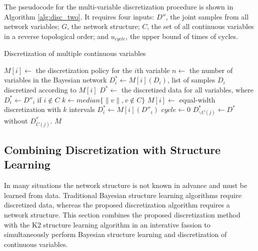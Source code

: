 The pseudocode for the multi-variable discretization procedure is shown in Algorithm \ref{alg:disc_two}.
It requires four inputs: $D''$, the joint samples from all network variables; $G$, the network structure; $C$, the set of all continuous variables in a reverse topological order; and $u_{cycle}$, the upper bound of times of cycles.

\begin{algorithm}
\label{alg:disc_two}
\caption{Discretization of multiple continuous variables }
\begin{algorithmic}[5]
\State
\State $M[i] \leftarrow$ the discretization policy for the $i$th variable
\State $n \leftarrow$ the number of variables in the Bayesian network
\State $D^*_i \leftarrow M[i] (D_i)$, list of samples $D_i$ discretized according to $M[i]$
\State $D^* \leftarrow $ the discretized data for all variables, where $D^*_i \leftarrow D''_i$ if $i \notin C$
\State $k \leftarrow median\{ \|v\|, v\notin C\}$
\State
{}
\State $M[i] \leftarrow$  equal-width discretization with $k$ intervals
\State $D^*_i \leftarrow  M[i] (D''_i)$
\EndIf
\EndFor
\State
\State $cycle \leftarrow 0$
\State $D^*_{\backslash C(j)} \leftarrow D^*$ without $D^*_{C(j)}$.
\EndFor
\EndWhile
\State \Return $M$
\EndFunction
\end{algorithmic}
\end{algorithm}

\subsection{Combining Discretization with Structure Learning}

In many situations the network structure is not known in advance and must be learned from data.
Traditional Bayesian structure learning algorithms require discretized data, whereas the proposed discretization algorithm requires a network structure.
This section combines the proposed discretization method with the K2 structure learning algorithm \citep{K2} in an interative fassion to simultaneously perform Bayesian structure learning and discretization of continuous variables.

